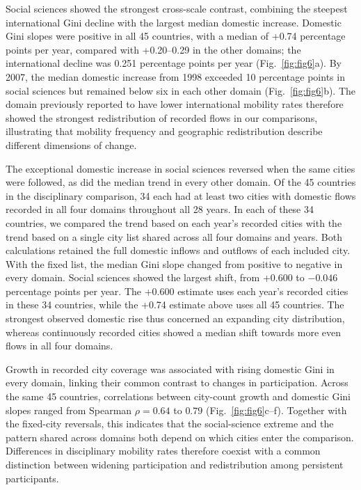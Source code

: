 Social sciences showed the strongest cross-scale contrast, combining the steepest international Gini decline with the largest median domestic increase. Domestic Gini slopes were positive in all 45 countries, with a median of +0.74 percentage points per year, compared with +0.20--0.29 in the other domains; the international decline was 0.251 percentage points per year (Fig.~\ref{fig:fig6}a). By 2007, the median domestic increase from 1998 exceeded 10 percentage points in social sciences but remained below six in each other domain (Fig.~\ref{fig:fig6}b). The domain previously reported to have lower international mobility rates\cite{ref033} therefore showed the strongest redistribution of recorded flows in our comparisons, illustrating that mobility frequency and geographic redistribution describe different dimensions of change.

The exceptional domestic increase in social sciences reversed when the same cities were followed, as did the median trend in every other domain. Of the 45 countries in the disciplinary comparison, 34 each had at least two cities with domestic flows recorded in all four domains throughout all 28 years. In each of these 34 countries, we compared the trend based on each year's recorded cities with the trend based on a single city list shared across all four domains and years. Both calculations retained the full domestic inflows and outflows of each included city. With the fixed list, the median Gini slope changed from positive to negative in every domain. Social sciences showed the largest shift, from +0.600 to $-0.046$ percentage points per year. The +0.600 estimate uses each year's recorded cities in these 34 countries, while the +0.74 estimate above uses all 45 countries. The strongest observed domestic rise thus concerned an expanding city distribution, whereas continuously recorded cities showed a median shift towards more even flows in all four domains.

Growth in recorded city coverage was associated with rising domestic Gini in every domain, linking their common contrast to changes in participation. Across the same 45 countries, correlations between city-count growth and domestic Gini slopes ranged from Spearman $\rho=0.64$ to $0.79$ (Fig.~\ref{fig:fig6}c--f). Together with the fixed-city reversals, this indicates that the social-science extreme and the pattern shared across domains both depend on which cities enter the comparison. Differences in disciplinary mobility rates\cite{ref033} therefore coexist with a common distinction between widening participation and redistribution among persistent participants.

\FloatBarrier
